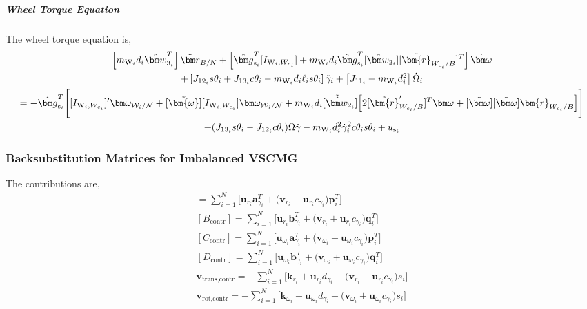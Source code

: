 \subparagraph{Wheel Torque Equation}

 The wheel torque equation is,
\begin{multline}
\left[ m_{\text{W}_i}d_i\hat{\bm w}_{3_i}^T \right] \ddot{\bm r}_{B/N} + \left[ \hat{\bm g}_{\text{s}_i}^T[I_{\text{W}_i,W_{c_i}}] + m_{\text{W}_i}d_i\hat{\bm g}_{\text{s}_i}^T[\tilde{\hat{\bm w}}_{2_i}][\tilde{\bm{r}}_{W_{c_i}/B}]^T \right] \dot{\bm\omega}
\\
+\left[ J_{12_i}s\theta_i + J_{13_i}c\theta_i - m_{\text{W}_i}d_i\ell_is\theta_i \right] \ddot{\gamma}_i
+ \left[ J_{11_i}  + m_{\text{W}_i}d_i^2 \right] \dot{\Omega}_i
\\
=-\hat{\bm g}_{\text{s}_i}^T \Bigg[ [I_{\text{W}_i,W_{c_i}}]'\bm\omega_{\mathcal{W}_i/\cal N} + [\tilde{\bm{\omega}}][I_{\text{W}_i,W_{c_i}}]\bm\omega_{\mathcal{W}_i/\cal N}  + m_{\text{W}_i}d_i[\tilde{\hat{\bm w}}_{2_i}] \Big[ 2[\tilde{\bm{r}}'_{W_{c_i}/B}]^T\bm\omega + [\tilde{\bm\omega}][\tilde{\bm\omega}]\bm{r}_{W_{c_i}/B}
\Big] \Bigg] \\+(J_{13_i}s\theta_i - J_{12_i}c\theta_i)\Omega\dot{\gamma} - m_{\text{W}_i}d_i^2\dot{\gamma}_i^2c\theta_is\theta_i
+ u_{\text{s}_i}
\end{multline}

\subsubsection{Backsubstitution Matrices for Imbalanced VSCMG}


The contributions are,
\begin{gather}
[A_\text{contr}] =  \sum\limits_{i=1}^{N}\Big[\bm{u}_{r_i}\bm{a}_{\gamma_i}^T + \big(\bm{v}_{r_i} + \bm{u}_{r_i}c_{\gamma_i}\big)\bm{p}_i^T\Big]
\\
[B_\text{contr}] =  \sum\limits_{i=1}^{N}\Big[\bm{u}_{r_i}\bm{b}_{\gamma_i}^T + \big(\bm{v}_{r_i} + \bm{u}_{r_i}c_{\gamma_i}\big)\bm{q}_i^T\Big]
\\
[C_\text{contr}] = \sum\limits_{i=1}^{N}\Big[\bm{u}_{\omega_i}\bm{a}_{\gamma_i}^T + \big(\bm{v}_{\omega_i} + \bm{u}_{\omega_i}c_{\gamma_i}\big)\bm{p}_i^T\Big]
\\
[D_\text{contr}] = \sum\limits_{i=1}^{N}\Big[\bm{u}_{\omega_i}\bm{b}_{\gamma_i}^T + \big(\bm{v}_{\omega_i} + \bm{u}_{\omega_i}c_{\gamma_i}\big)\bm{q}_i^T\Big]
\\
\bm{v}_\text{trans,contr} =  -  \sum\limits_{i=1}^{N}\Big[\bm{k}_{r_i}+\bm{u}_{r_i}d_{\gamma_i} + \big(\bm{v}_{r_i} + \bm{u}_{r_i}c_{\gamma_i}\big)s_i\Big]
\\
\bm{v}_\text{rot,contr} = -  \sum\limits_{i=1}^{N}\Big[\bm{k}_{\omega_i} +\bm{u}_{\omega_i}d_{\gamma_i}+ \big(\bm{v}_{\omega_i} + \bm{u}_{\omega_i}c_{\gamma_i}\big)s_i\Big]
\end{gather}
